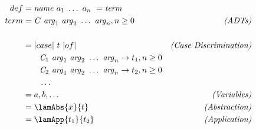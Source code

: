 \begin{minipage}{5.1in}
  \begin{align*}
    def &= \mathit{name}\ a_1\ \ldots\ a_n\ = \mathit{term} \\
    term &= \mathit{C}\ \mathit{arg}_1\ \mathit{arg}_2\ \ldots\ \mathit{arg}_n, n \ge 0 & \hfil\text{\emph{(ADTs)}} \\ \\
    &= |case|\ t\ |of| & \hfil\text{\emph{(Case Discrimination)}} \\
    & \qquad\mathit{C}_1\ \mathit{arg}_1\ \mathit{arg}_2\ \ldots\ \mathit{arg}_n \rightarrow t_1, n \ge 0 \\
    & \qquad\mathit{C}_2\ \mathit{arg}_1\ \mathit{arg}_2\ \ldots\ \mathit{arg}_n \rightarrow t_2, n \ge 0 \\
    & \qquad\ldots \\
    &= a, b, \ldots & \hfill\text{\emph{(Variables)}} \\
    &= \lamAbs{x}{t} & \hfill\text{\emph{(Abstraction)}} \\ 
    &= \lamApp{t_1}{t_2} & \hfill\text{\emph{(Application)}}  
  \end{align*}
\end{minipage}
